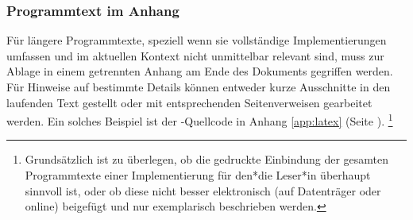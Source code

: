 \subsubsection{Programmtext im Anhang}

Für längere Programmtexte, speziell wenn sie vollständige Implementierungen
umfassen und im aktuellen Kontext nicht unmittelbar relevant sind, muss zur
Ablage in einem getrennten Anhang am Ende des Dokuments gegriffen werden. Für
Hinweise auf bestimmte Details können entweder kurze Ausschnitte in den
laufenden Text gestellt oder mit entsprechenden Seitenverweisen gearbeitet
werden. Ein solches Beispiel ist der \latex-Quellcode in Anhang
\ref{app:latex} (Seite \pageref{app:latex}).%
\footnote{Grundsätzlich ist zu überlegen, ob die gedruckte Einbindung der
gesamten Programmtexte einer Implementierung für den*die Leser*in überhaupt
sinnvoll ist, oder ob diese nicht besser elektronisch (auf Datenträger oder online)
beigefügt und nur exemplarisch beschrieben werden.}
